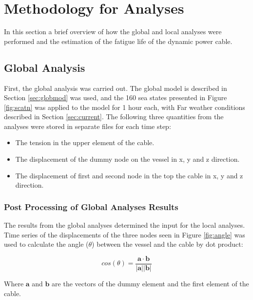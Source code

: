 \chapter{Methodology for Analyses}
\label{chap:estimation}
In this section a brief overview of how the global and local analyses were performed and the estimation of the fatigue life of the dynamic power cable. 
\section{Global Analysis}
First, the global analysis was carried out. The global model is described in Section \ref{sec:globmod} was used, and the 160 sea states presented in Figure \ref{fig:scatn} was applied to the model for 1 hour each, with Far weather conditions described in Section \ref{sec:current}. The following three quantities from the analyses were stored in separate files for each time step:
\begin{itemize}
    \item The  tension in the upper element of the cable.
    \item The displacement of the dummy node on the vessel in x, y and z direction.
    \item The  displacement of first and second node in the top the cable in x, y and z direction.
\end{itemize}

\subsection{Post Processing of Global Analyses Results}
The results from the global analyses determined the input for the local analyses. Time series of the displacements of the three nodes seen in Figure \ref{fig:angle} was used to calculate the angle ($\theta$) between the vessel and the cable by dot product: 

\begin{equation}
    cos(\theta) = \frac{\boldsymbol{a \cdot b}}{|\boldsymbol{a}||\boldsymbol{b}| }
\end{equation}

Where $\boldsymbol{a}$ and $\boldsymbol{b}$ are the vectors of the dummy element and the first element of the cable. 

